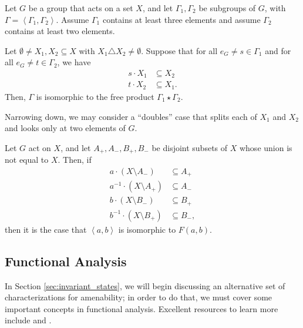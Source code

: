 \documentclass[10pt]{mypackage2}
\begin{document}
\begin{theorem}\label{thm:ping_pong}
  Let $G$ be a group that acts on a set $X$, and let $\Gamma_1,\Gamma_2$ be subgroups of $G$, with $\Gamma = \left\langle \Gamma_1,\Gamma_2 \right\rangle$. Assume $\Gamma_1$ contains at least three elements and assume $\Gamma_2$ contains at least two elements.\newline

  Let $\emptyset\neq X_1,X_2\subseteq X$ with $X_1\triangle X_2\neq\emptyset$. Suppose that for all $e_G\neq s\in \Gamma_1$ and for all $e_G\neq t\in \Gamma_2$, we have
  \begin{align*}
    s\cdot X_1&\subseteq X_2\\
    t\cdot X_2&\subseteq X_1.
  \end{align*}
  Then, $\Gamma$ is isomorphic to the free product $\Gamma_1\star \Gamma_2$.
\end{theorem}
Narrowing down, we may consider a ``doubles'' case that splits each of $X_1$ and $X_2$ and looks only at two elements of $G$.
\begin{corollary}\label{corollary:ping_pong_doubles}
  Let $G$ act on $X$, and let $A_{+}, A_{-},B_{+},B_{-}$ be disjoint subsets of $X$ whose union is not equal to $X$. Then, if
  \begin{align*}
    a\cdot \left(X\setminus A_{-}\right) &\subseteq A_{+}\\
    a^{-1}\cdot \left(X\setminus A_{+}\right) &\subseteq A_{-}\\
    b\cdot \left(X\setminus B_{-}\right) &\subseteq B_{+}\\
    b^{-1}\cdot \left(X\setminus B_{+}\right) &\subseteq B_{-},
  \end{align*}
  then it is the case that $\left\langle a,b \right\rangle$ is isomorphic to $F(a,b)$.
\end{corollary}
\subsection{Functional Analysis}%
In Section \ref{sec:invariant_states}, we will begin discussing an alternative set of characterizations for amenability; in order to do that, we must cover some important concepts in functional analysis. Excellent resources to learn more include \cite{rudin_functional_analysis} and \cite{aliprantis_infinite_dimensional_analysis}.\newline
\end{document}
